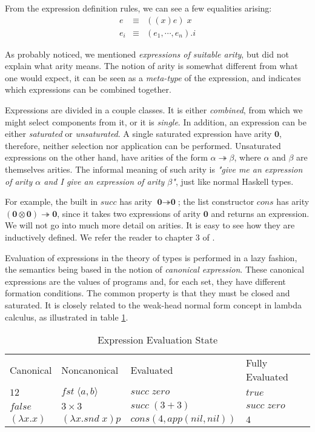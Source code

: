 From the expression definition rules, we can see a few equalities arising:
\begin{eqnarray*}
  e & \equiv & ((x)e)\;x \\
  e_i & \equiv & (e_1, \cdots, e_n).i
\end{eqnarray*}

As probably noticed, we mentioned \emph{expressions of suitable arity}, but did not explain
what arity means. The notion of arity is somewhat different from what one would expect, it can
be seen as a \emph{meta-type} of the expression, and indicates which expressions can be combined
together.

\newcommand{\arzero}{\textbf{0}}
\newcommand{\ararr}{\twoheadrightarrow}
\newcommand{\armul}{\otimes}

Expressions are divided in a couple classes. It is either \emph{combined}, from which we
might select components from it, or it is \emph{single}. In addition, an expression
can be either \emph{saturated} or \emph{unsaturated}. A single saturated expression
have arity $\arzero$, therefore, neither selection nor application can be performed.
Unsaturated expressions on the other hand, have arities of the form $\alpha \ararr \beta$,
where $\alpha$ and $\beta$ are themselves arities. The informal meaning of such arity is \emph{"give me an expression
of arity $\alpha$ and I give an expression of arity $\beta$"}, just like normal Haskell types. 

For example, the built in $succ$ has arity $\arzero \ararr \arzero$; the list constructor
$cons$ has arity $(\arzero \armul \arzero) \ararr \arzero$, since it takes two expressions
of arity $\arzero$ and returns an expression. We will not go into much more detail 
on arities. It is easy to see how they are inductively defined. We refer the reader
to chapter 3 of \cite{nords90}.

Evaluation of expressions in the theory of types is performed in a lazy fashion, the semantics
being based in the notion of \emph{canonical expression}. These canonical expressions are the values
of programs and, for each set, they have different formation conditions. The common property is
that they must be closed and saturated. It is closely related to the weak-head normal form concept in
lambda calculus, as illustrated in table \ref{table:expr_evaluation_state}.

\begin{center}
\begin{table}[h]
\begin{tabular}{p{3cm} p{3cm} p{3cm} p{3cm}}
  Canonical & Noncanonical & Evaluated & Fully Evaluated \\  
  $12$ & $fst\;\langle a , b \rangle$ & $succ\;zero$ & $true$ \\
  $false$ & $3 \times 3$ & $succ\;(3 + 3)$ & $succ\;zero$ \\
  $(\lambda x . x)$ & $(\lambda x . snd\;x) p$ & $cons(4, app(nil, nil))$ & $4$
\end{tabular}
\caption{Expression Evaluation State}
\label{table:expr_evaluation_state}
\end{table}
\end{center}

